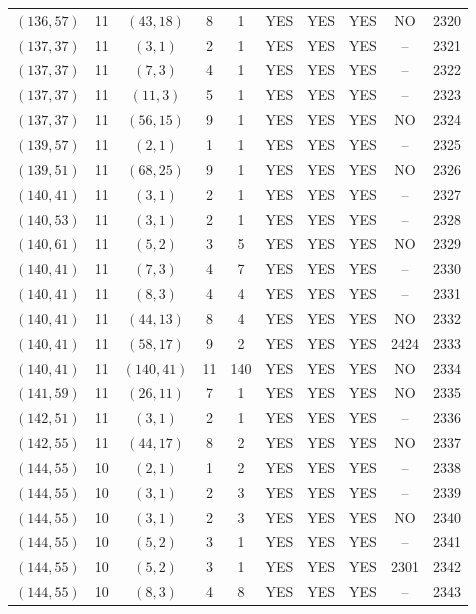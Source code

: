 \begin{longtable}{|c|c|c|c|c|c|c|c|c|c|}
$(136, 57)$ & 11 & $(43, 18)$ & 8 & 1 & YES & YES & YES & NO & 2320\\
$(137, 37)$ & 11 & $(3, 1)$ & 2 & 1 & YES & YES & YES & -- & 2321\\
$(137, 37)$ & 11 & $(7, 3)$ & 4 & 1 & YES & YES & YES & -- & 2322\\
$(137, 37)$ & 11 & $(11, 3)$ & 5 & 1 & YES & YES & YES & -- & 2323\\
$(137, 37)$ & 11 & $(56, 15)$ & 9 & 1 & YES & YES & YES & NO & 2324\\
$(139, 57)$ & 11 & $(2, 1)$ & 1 & 1 & YES & YES & YES & -- & 2325\\
$(139, 51)$ & 11 & $(68, 25)$ & 9 & 1 & YES & YES & YES & NO & 2326\\
$(140, 41)$ & 11 & $(3, 1)$ & 2 & 1 & YES & YES & YES & -- & 2327\\
$(140, 53)$ & 11 & $(3, 1)$ & 2 & 1 & YES & YES & YES & -- & 2328\\
$(140, 61)$ & 11 & $(5, 2)$ & 3 & 5 & YES & YES & YES & NO & 2329\\
$(140, 41)$ & 11 & $(7, 3)$ & 4 & 7 & YES & YES & YES & -- & 2330\\
$(140, 41)$ & 11 & $(8, 3)$ & 4 & 4 & YES & YES & YES & -- & 2331\\
$(140, 41)$ & 11 & $(44, 13)$ & 8 & 4 & YES & YES & YES & NO & 2332\\
$(140, 41)$ & 11 & $(58, 17)$ & 9 & 2 & YES & YES & YES & 2424 & 2333\\
$(140, 41)$ & 11 & $(140, 41)$ & 11 & 140 & YES & YES & YES & NO & 2334\\
$(141, 59)$ & 11 & $(26, 11)$ & 7 & 1 & YES & YES & YES & NO & 2335\\
$(142, 51)$ & 11 & $(3, 1)$ & 2 & 1 & YES & YES & YES & -- & 2336\\
$(142, 55)$ & 11 & $(44, 17)$ & 8 & 2 & YES & YES & YES & NO & 2337\\
$(144, 55)$ & 10 & $(2, 1)$ & 1 & 2 & YES & YES & YES & -- & 2338\\
$(144, 55)$ & 10 & $(3, 1)$ & 2 & 3 & YES & YES & YES & -- & 2339\\
$(144, 55)$ & 10 & $(3, 1)$ & 2 & 3 & YES & YES & YES & NO & 2340\\
$(144, 55)$ & 10 & $(5, 2)$ & 3 & 1 & YES & YES & YES & -- & 2341\\
$(144, 55)$ & 10 & $(5, 2)$ & 3 & 1 & YES & YES & YES & 2301 & 2342\\
$(144, 55)$ & 10 & $(8, 3)$ & 4 & 8 & YES & YES & YES & -- & 2343\\

\end{longtable}
